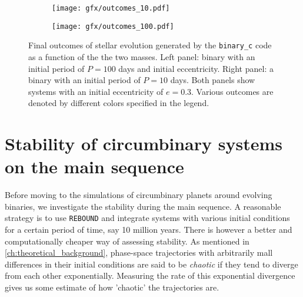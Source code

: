 \documentclass[ twoside,openright,titlepage,numbers=noenddot,headinclude,%
                footinclude=true,cleardoublepage=empty,abstractoff, %
                BCOR=5mm,paper=a4,fontsize=11pt,%
                american,%
                ]{scrreprt}
\begin{document}
\begin{figure}[t!]
\centering
\begin{subfigure}{0.52\textwidth}
  \centering
  \texttt{[image: gfx/outcomes\_10.pdf]}
\end{subfigure}%
\begin{subfigure}{0.52\textwidth}
  \centering
  \texttt{[image: gfx/outcomes\_100.pdf]}
\end{subfigure}
    \caption{Final outcomes of stellar evolution generated by the 
    \texttt{binary\_c} code as a function of the the two masses. Left panel: 
    binary with an initial period of $P=100$ days and initial eccentricity. 
    Right panel: a 
    binary with an initial period of $P=10$ days. Both panels show systems 
    with an initial eccentricity of $e=0.3$. Various outcomes are denoted
    by different colors specified in the legend.}
\label{fig:evolution_outcomes}
\end{figure}

\section{Stability of circumbinary systems on the main sequence}
\label{sec:Stability of observed circumbinary planets on the main sequence}
Before moving  to the simulations of circumbinary planets around evolving
binaries, we investigate the stability during the main sequence. A reasonable
strategy is to use \texttt{REBOUND} and integrate systems with various initial
conditions for a certain period of time, say 10 million years. There is however
a better and computationally cheaper way of assessing stability. As mentioned
in \cref{ch:theoretical_background}, phase-space trajectories with arbitrarily 
mall differences in their initial conditions are said to be 
\emph{chaotic} if they tend to diverge 
from each other exponentially.  Measuring the rate of this exponential 
divergence gives us some estimate of how 'chaotic' the trajectories are.
\end{document}
